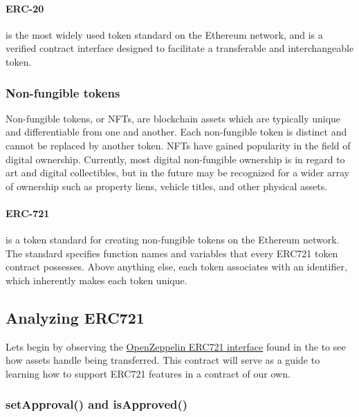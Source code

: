 \documentclass{article}
\theoremstyle{theorem}
\theoremstyle{definition}
\theoremstyle{remark}
\begin{document}
\begin{itemize}
\paragraph{ERC-20} is the most widely used token standard on the Ethereum network, and is a verified contract interface designed to facilitate a transferable and interchangeable token. 

\end{itemize}

\subsubsection{Non-fungible tokens}  
Non-fungible tokens, or NFTs, are blockchain assets which are typically unique and differentiable from one and another. Each non-fungible token is distinct and cannot be replaced by another token. NFTs have gained popularity in the field of digital ownership. Currently, most digital non-fungible ownership is in regard to art and digital collectibles, but in the future may be recognized for a wider array of ownership such as property liens, vehicle titles, and other physical assets.
\begin{itemize}

\paragraph{ERC-721} is a token standard for creating non-fungible tokens on the Ethereum network. The standard specifies function names and variables that every ERC721 token contract  possesses. Above anything else, each token associates with an identifier, which inherently makes each token unique.

\end{itemize}

\subsection{Analyzing ERC721} \label{analyzing}
\medskip\noindent
Lets begin by observing the \href{https://github.com/OpenZeppelin/openzeppelin-contracts/blob/master/contracts/token/ERC721/IERC721.sol}{OpenZeppelin ERC721 interface} found in the \cite{OZ} to see how assets handle being transferred. This contract will serve as a guide to learning how to support ERC721 features in a contract of our own.


\subsubsection{setApproval() and isApproved()}
\end{document}
